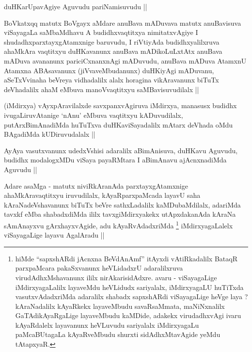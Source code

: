 \begin{artha}
duHKarUpavAgiye Aguvudu pariNamisuvudu ||
\end{artha}

\begin{artha}
BoVkatxqq matutx BoVgayx aMdare anuBava mADuvava matutx anuBavisuva viSayagaLa saMbaMdhavu A budidhxvaqtitxya nimitatxvAgiye I shudadhxparxtayxgAtamxnige baruvudu, I riVtiyAda budidhxyalilxruva ahaMkAra vaqtitxyu duHKavanunx anuBava mADikoLuLxtAtx anuBava mADuva avananunx pariciCxnanxnAgi mADuvudu, anuBava mADuva AtamxnU Atamxna ABAsavanunx (jiVvaveMbudanunx) duHKiyAgi mADuvanu, aSeTxVvinaha beVreya vidhadalilx alalx horagina vikAravanunx biTuTx deVhadalilx ahaM eMbuva manoVvaqtitxyu saMBavisuvudilalx ||
\end{artha}


\begin{artha}
(iMdirxya) vAyxpAravilalxde savxpanxvAgiruva iMdirxya, manasusx budidhx ivugaLiruvAtanige `nAnu' eMbuva vaqtitxyu kADuvudilalx, putArxBimAnadiMda huTuTxva duHKaviSayadalilx mAtarx deVhada oMdu BAgadiMda kUDiruvudalalx ||
\end{artha}


\begin{artha}
AyAya vasutxvanunx udedxVshisi adaralilx aBimAnisuva, duHKavu Aguvudu, budidhx modalogxMDu viSaya payaRMtara I aBimAnavu ajAcnxnadiMda Aguvudu ||
\end{artha}


\begin{artha}
Adare asaMga - matutx niviRkAranAda parxtayxgAtamxnige ahaMkAravaqtitxyu iruvudilalx, kAyaRparxpaMcada layavU saha kAraNadeVshavanunx biTuTx beVre sathxLadalilx kaMDubaMdilalx, adariMda tavxkf eMba shabadxdiMda ililx tavxgiMdirxyakekx utApxdakanAda kAraNa sAmAnayxvu gArxhayxvAgide, adu kAyaRvAdadxriMda \footnote[1]{hiMde ``sapxshARdi jAcnxna BeVdAnAmf'' itAyxdi vAtiRkadalilx BataqR parxpaMcara pakaSxvanunx heVLidadxrU adaralilxruva virudAdhxMshavanunx ililx nirAkarisidAdxre. avaru - viSayagaLige iMdirxyagaLalilx layaveMdu heVLidudx sariyalalx, iMdirxyagaLU huTiTxda vasutxvAdadxriMda adaralilx shabadx sapxshARdi viSayagaLige heVge laya ? kAraNadalilx kAyaRkekx layaveMbudu savaRsaMmata, maNiNxnalilx GaTAdikAyaRgaLige layaveMbudu kaMDide, adakekx virudadhxvAgi ivaru kAyaRdalelx layavanunx heVLuvudu sariyalalx iMdirxyagaLu paMcaBUtagaLa kAyaRveMbudu shurxti sidAdhxMtavAgide yeMdu tAtapxyaR.} iMdirxyagaLalelx viSayagaLige layavu AgalAradu ||
\end{artha}

